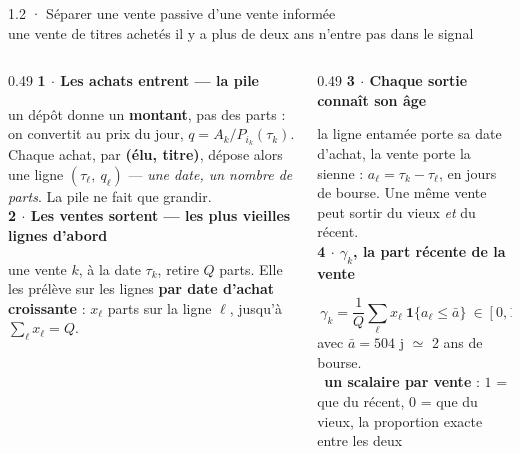 \documentclass[11pt,aspectratio=169]{beamer}
\newcommand{\et}[2]{{\color{bleu}\bfseries #1 $\cdot$ #2}\par\vspace{0.6mm}}
\newcommand{\obs}[1]{{\color{bleu}\scriptsize\textbullet}~{\scriptsize #1}\par\vspace{0.4mm}}
\begin{document}
\begin{frame}{1.2 · Séparer une vente passive d'une vente informée\\
  {\normalsize\mdseries une vente de titres achetés il y a plus de deux ans n'entre pas dans le signal}}
  \begin{columns}[T]
    \begin{column}{0.49\textwidth}
      \et{1}{Les achats entrent --- la pile}
      {\scriptsize un dépôt donne un \textbf{montant}, pas des parts : on convertit au prix du
       jour, $q = A_k / P_{i_k}(\tau_k)$. Chaque achat, par \textbf{(élu, titre)}, dépose alors
       une ligne $(\tau_\ell,\ q_\ell)$ --- \emph{une date, un nombre de parts}. La pile ne fait
       que grandir.}\\[3mm]
      \et{2}{Les ventes sortent --- les plus vieilles lignes d'abord}
      {\scriptsize une vente $k$, à la date $\tau_k$, retire $Q$ parts. Elle les prélève sur les
       lignes \textbf{par date d'achat croissante} : $x_\ell$ parts sur la ligne $\ell$, jusqu'à
       $\textstyle\sum_\ell x_\ell = Q$.}
    \end{column}
    \begin{column}{0.49\textwidth}
      \et{3}{Chaque sortie connaît son âge}
      {\scriptsize la ligne entamée porte sa date d'achat, la vente porte la sienne :
       $a_\ell = \tau_k - \tau_\ell$, en jours de bourse. Une même vente peut sortir du vieux
       \emph{et} du récent.}\\[2.5mm]
      \et{4}{$\gamma_k$, la part récente de la vente}
      {\footnotesize\[ \boxed{\ \gamma_k = \frac{1}{Q}\sum_{\ell} x_\ell\
                        \mathbf 1\{a_\ell \leq \bar a\} \ \in [0,1]\ } \]}
      \vspace{-1.5mm}
      {\scriptsize avec $\bar a = 504$ j $\simeq$ 2 ans de bourse.}\\[1.5mm]
      \obs{\textbf{un scalaire par vente} : $1$ = que du récent, $0$ = que du vieux, la
       proportion exacte entre les deux}
    \end{column}
  \end{columns}
\end{frame}
\end{document}
